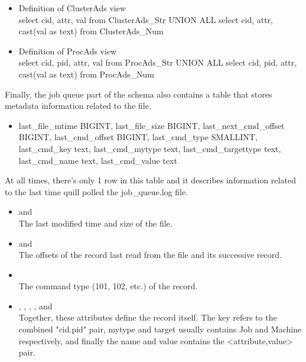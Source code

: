 \begin{itemize}
\item Definition of ClusterAds view\\
		{select cid, 
		attr, 
		val from ClusterAds\_Str UNION ALL
		select cid, 
		attr, 
		cast(val as text) from ClusterAds\_Num}


\item Definition of ProcAds view\\
		{select cid, 
		pid, 
		attr, 
		val from ProcAds\_Str UNION ALL
		select cid, 
		pid, 
		attr, 
		cast(val as text) from ProcAds\_Num}

\end{itemize}

Finally, the job queue part of the schema also contains a table that
stores metadata information related to the  file.

\begin{itemize}
\item {}
        {last\_file\_mtime         BIGINT,
        last\_file\_size          BIGINT,
        last\_next\_cmd\_offset    BIGINT,
        last\_cmd\_offset         BIGINT,
        last\_cmd\_type           SMALLINT,
        last\_cmd\_key            text,
        last\_cmd\_mytype         text,
        last\_cmd\_targettype     text,
        last\_cmd\_name           text,
        last\_cmd\_value          text}
\end{itemize}
	
At all times, there's only 1 row in this table and it describes
information related to the last time quill polled the job\_queue.log file.

\begin{itemize}
\item {} and \\
	The last modified time and size of the file.

\item {} and \\
	The offsets of the record last read from the file and its successive record.

\item {}\\
	The command type (101, 102, etc.) of the record.

\item	{}, 
		, 
		,
		,
		and
		\\
	Together, these attributes define the record itself.	The key
	refers to the combined "cid.pid" pair, mytype and target usually
	contains Job and Machine respectively, and finally the name and
	value contains the <attribute,value> pair.
\end{itemize}

